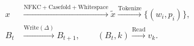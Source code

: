 \documentclass[border=4pt]{standalone}
\begin{document}
$\displaystyle
\begin{aligned}
x&\xrightarrow{\mathrm{NFKC+Casefold+Whitespace}}\tilde x
\xrightarrow{\mathrm{Tokenize}}\{(w_i,p_i)\},\\
B_t&\xrightarrow{\mathrm{Write}(\Delta)}B_{t+1},
\qquad(B_t,k)\xrightarrow{\mathrm{Read}}v_k.
\end{aligned}
$
\end{document}
